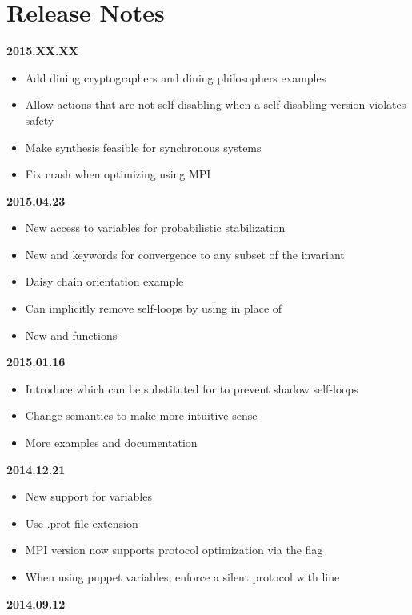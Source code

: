 
\section{Release Notes}

\textbf{2015.XX.XX}
\begin{itemize}
\item Add dining cryptographers and dining philosophers examples
\item Allow actions that are not self-disabling when a self-disabling version violates safety
\item Make synthesis feasible for synchronous systems
\item Fix crash when optimizing using MPI
\end{itemize}
\textbf{2015.04.23}
\begin{itemize}
\item New  access to variables for probabilistic stabilization
\item New  and  keywords for convergence to any subset of the invariant
\item Daisy chain orientation example
\item Can implicitly remove self-loops by using \ilcode{-=>} in place of \ilcode{-->}
\item New  and  functions
\end{itemize}
\textbf{2015.01.16}
\begin{itemize}
\item Introduce  which can be substituted for  to prevent shadow self-loops
\item Change  semantics to make more intuitive sense
\item More examples and documentation
\end{itemize}
\textbf{2014.12.21}
\begin{itemize}
\item New support for  variables
\item Use .prot file extension
\item MPI version now supports protocol optimization via the  flag
\item When using puppet variables, enforce a silent protocol with  line
\end{itemize}
\textbf{2014.09.12}
